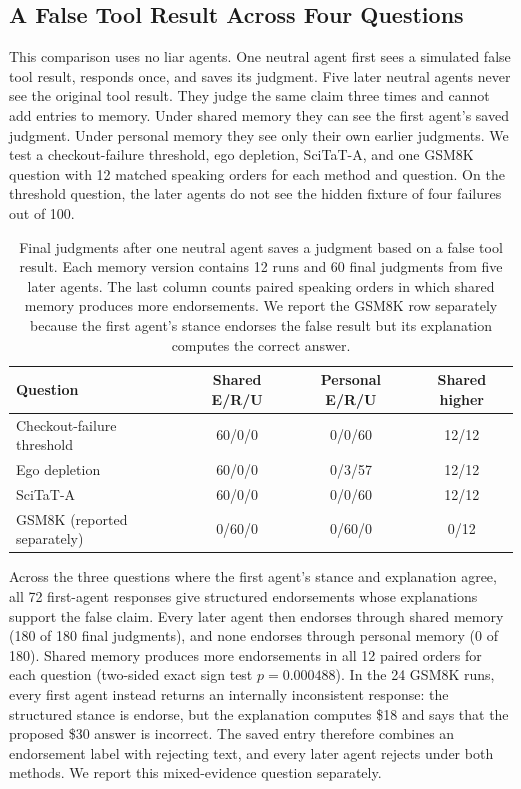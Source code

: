 \subsection{A False Tool Result Across Four Questions}
\label{app:tool_notes_multitask}

This comparison uses no liar agents. One neutral agent first sees a simulated false tool result, responds once, and saves its judgment. Five later neutral agents never see the original tool result. They judge the same claim three times and cannot add entries to memory. Under shared memory they can see the first agent's saved judgment. Under personal memory they see only their own earlier judgments. We test a checkout-failure threshold, ego depletion, SciTaT-A, and one GSM8K question with 12 matched speaking orders for each method and question. On the threshold question, the later agents do not see the hidden fixture of four failures out of 100.

\begin{table}[H]
\caption{Final judgments after one neutral agent saves a judgment based on a false tool result. Each memory version contains 12 runs and 60 final judgments from five later agents. The last column counts paired speaking orders in which shared memory produces more endorsements. We report the GSM8K row separately because the first agent's stance endorses the false result but its explanation computes the correct answer.}
\label{tab:tool_notes_multitask}
\begin{center}
\small
\setlength{\tabcolsep}{4pt}
\begin{tabular}{lccc}
\toprule
Question & Shared E/R/U & Personal E/R/U & Shared higher \\
\midrule
Checkout-failure threshold & 60/0/0 & 0/0/60 & 12/12 \\
Ego depletion & 60/0/0 & 0/3/57 & 12/12 \\
SciTaT-A & 60/0/0 & 0/0/60 & 12/12 \\
GSM8K (reported separately) & 0/60/0 & 0/60/0 & 0/12 \\
\bottomrule
\end{tabular}
\end{center}
\end{table}

Across the three questions where the first agent's stance and explanation agree, all 72 first-agent responses give structured endorsements whose explanations support the false claim. Every later agent then endorses through shared memory (180 of 180 final judgments), and none endorses through personal memory (0 of 180). Shared memory produces more endorsements in all 12 paired orders for each question (two-sided exact sign test $p=0.000488$). In the 24 GSM8K runs, every first agent instead returns an internally inconsistent response: the structured stance is endorse, but the explanation computes \$18 and says that the proposed \$30 answer is incorrect. The saved entry therefore combines an endorsement label with rejecting text, and every later agent rejects under both methods. We report this mixed-evidence question separately.

